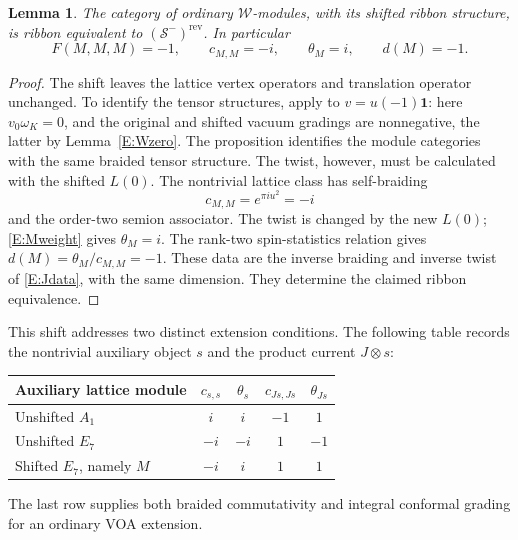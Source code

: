 \documentclass[11pt]{article}
\newtheorem{lemma}[theorem]{Lemma}
\newcommand{\one}{\mathbf1}\newcommand{\D}{\mathcal D}\newcommand{\Dcat}{\mathcal D}
\newcommand{\Scat}{\mathcal S}\newcommand{\U}{\mathcal U}\newcommand{\bo}{\boxtimes}
\numberwithin{equation}{section}
\begin{document}
\begin{lemma}\label{E:inverse}
The category of ordinary $\mathcal W$-modules, with its shifted ribbon structure, is ribbon equivalent to $(\Scat^-)^{\mathrm{rev}}$. In particular
\[
F(M,M,M)=-1,\qquad c_{M,M}=-i,\qquad
\theta_M=i,\qquad d(M)=-1.
\]
\end{lemma}
\begin{proof}
The shift leaves the lattice vertex operators and translation operator unchanged. To identify the tensor structures, apply \cite[Proposition~2.17]{A:McR} to $v=u(-1)\one$: here $v_0\omega_K=0$, and the original and shifted vacuum gradings are nonnegative, the latter by Lemma~\ref{E:Wzero}. The proposition identifies the module categories with the same braided tensor structure. The twist, however, must be calculated with the shifted $L(0)$. The nontrivial lattice class has self-braiding
\[
c_{M,M}=e^{\pi i u^2}=-i
\]
and the order-two semion associator. The twist is changed by the new $L(0)$; \eqref{E:Mweight} gives $\theta_M=i$. The rank-two spin-statistics relation gives $d(M)=\theta_M/c_{M,M}=-1$. These data are the inverse braiding and inverse twist of \eqref{E:Jdata}, with the same dimension. They determine the claimed ribbon equivalence.
\end{proof}

This shift addresses two distinct extension conditions. The following table records the nontrivial auxiliary object $s$ and the product current $J\otimes s$:
\begin{center}
\begin{tabular}{lcccc}
\toprule
Auxiliary lattice module&$c_{s,s}$&$\theta_s$&$c_{Js,Js}$&$\theta_{Js}$\\
\midrule
Unshifted $A_1$&$i$&$i$&$-1$&$1$\\
Unshifted $E_7$&$-i$&$-i$&$1$&$-1$\\
Shifted $E_7$, namely $M$&$-i$&$i$&$1$&$1$\\
\bottomrule
\end{tabular}
\end{center}
The last row supplies both braided commutativity and integral conformal grading for an ordinary VOA extension.
\end{document}
